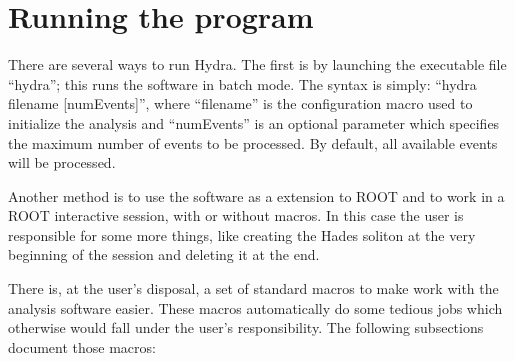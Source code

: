 \section{Running the program}

There are several ways to run Hydra. The first is by launching the executable file ``hydra''; 
this runs the software in batch mode. The syntax is simply: ``hydra filename [numEvents]'', 
where ``filename'' is the configuration macro used to initialize the analysis and ``numEvents'' 
is an optional parameter which specifies the maximum number of events to be processed. 
By default, all available events will be processed.

Another method is to use the software as a extension to ROOT and to work in a ROOT 
interactive session, with or without macros. In this case the user is responsible for 
some more things, like creating the Hades soliton at the very beginning of the session 
and deleting it at the end.

There is, at the user's disposal, a set of standard macros to make work with the 
analysis software easier. These macros automatically do some tedious jobs which 
otherwise would fall under the user's responsibility. The following subsections 
document those macros:









